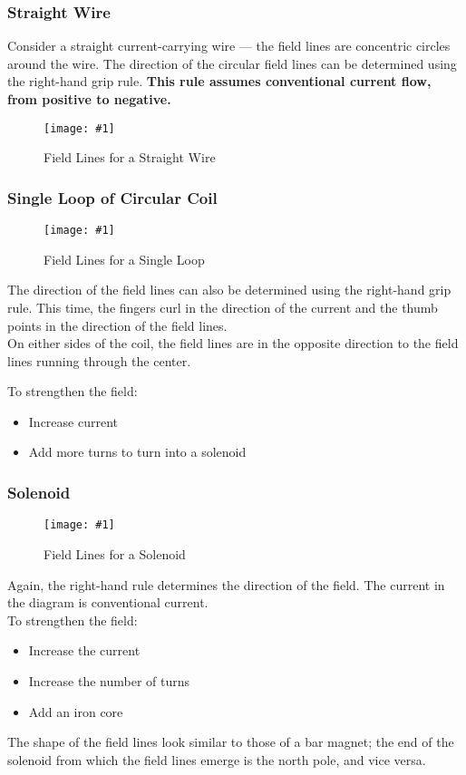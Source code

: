 \documentclass[a4paper,12pt]{article}
\newcommand{\lb}{\\[8pt]}
\newcommand{\img}[4]{\begin{center}
  \begin{figure}[H]
    \centering
    \texttt{[image: \#1]}
    \caption{#3}
    \label{fig:#4}
  \end{figure}
\end{center}}
\begin{document}
\subsubsection{Straight Wire}

Consider a straight current-carrying wire --- the field lines are concentric circles around the wire. The direction of the circular field lines can be determined using the right-hand grip rule. \textbf{This rule assumes conventional current flow, from positive to negative.}

\img{straightwire.jpg}{0.5}{Field Lines for a Straight Wire}{straightwire}

\subsubsection{Single Loop of Circular Coil}

\img{singleloop.png}{0.7}{Field Lines for a Single Loop}{singleloop}

The direction of the field lines can also be determined using the right-hand grip rule. This time, the fingers curl in the direction of the current and the thumb points in the direction of the field lines.\lb
On either sides of the coil, the field lines are in the opposite direction to the field lines running through the center.

To strengthen the field:
\begin{itemize}
  \item Increase current
  \item Add more turns to turn into a solenoid
\end{itemize}

\pagebreak

\subsubsection{Solenoid}

\img{solenoid.jpg}{0.9}{Field Lines for a Solenoid}{solenoid}

Again, the right-hand rule determines the direction of the field. The current in the diagram is conventional current.\lb
To strengthen the field:
\begin{itemize}
  \item Increase the current
  \item Increase the number of turns
  \item Add an iron core
\end{itemize}
The shape of the field lines look similar to those of a bar magnet; the end of the solenoid from which the field lines emerge is the north pole, and vice versa.
\end{document}
